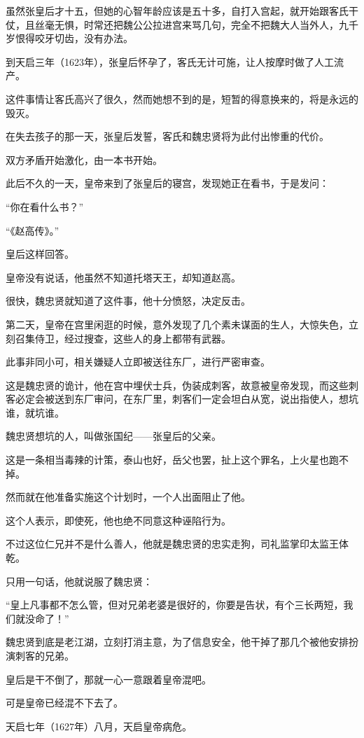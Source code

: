 \begin{multicols}{\theparacolNo}
		虽然张皇后才十五，但她的心智年龄应该是五十多，自打入宫起，就开始跟客氏干仗，且丝毫无惧，时常还把魏公公拉进宫来骂几句，完全不把魏大人当外人，九千岁恨得咬牙切齿，没有办法。

		到天启三年（1623年），张皇后怀孕了，客氏无计可施，让人按摩时做了人工流产。

		这件事情让客氏高兴了很久，然而她想不到的是，短暂的得意换来的，将是永远的毁灭。

		在失去孩子的那一天，张皇后发誓，客氏和魏忠贤将为此付出惨重的代价。

		双方矛盾开始激化，由一本书开始。

		此后不久的一天，皇帝来到了张皇后的寝宫，发现她正在看书，于是发问：

		“你在看什么书？”

		“《赵高传》。”

		皇后这样回答。

		皇帝没有说话，他虽然不知道托塔天王，却知道赵高。

		很快，魏忠贤就知道了这件事，他十分愤怒，决定反击。

		第二天，皇帝在宫里闲逛的时候，意外发现了几个素未谋面的生人，大惊失色，立刻召集侍卫，经过搜查，这些人的身上都带有武器。

		此事非同小可，相关嫌疑人立即被送往东厂，进行严密审查。

		这是魏忠贤的诡计，他在宫中埋伏士兵，伪装成刺客，故意被皇帝发现，而这些刺客必定会被送到东厂审问，在东厂里，刺客们一定会坦白从宽，说出指使人，想坑谁，就坑谁。

		魏忠贤想坑的人，叫做张国纪——张皇后的父亲。

		这是一条相当毒辣的计策，泰山也好，岳父也罢，扯上这个罪名，上火星也跑不掉。

		然而就在他准备实施这个计划时，一个人出面阻止了他。

		这个人表示，即使死，他也绝不同意这种诬陷行为。

		不过这位仁兄并不是什么善人，他就是魏忠贤的忠实走狗，司礼监掌印太监王体乾。

		只用一句话，他就说服了魏忠贤：

		“皇上凡事都不怎么管，但对兄弟老婆是很好的，你要是告状，有个三长两短，我们就没命了！”

		魏忠贤到底是老江湖，立刻打消主意，为了信息安全，他干掉了那几个被他安排扮演刺客的兄弟。

		皇后是干不倒了，那就一心一意跟着皇帝混吧。

		可是皇帝已经混不下去了。

		天启七年（1627年）八月，天启皇帝病危。


\end{multicols}
